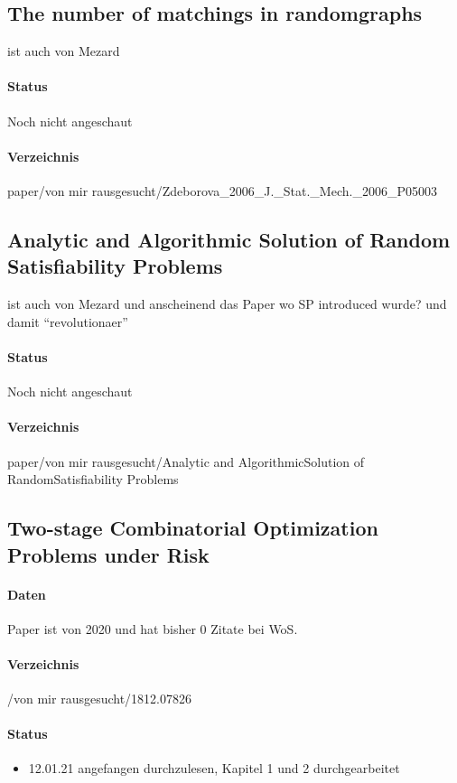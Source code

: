 \documentclass[paper=a4,10pt]{scrartcl}
\begin{document}
\subsection{The number of matchings in randomgraphs}

ist auch von Mezard

\paragraph{Status} Noch nicht angeschaut
\paragraph{Verzeichnis} paper/von mir rausgesucht/Zdeborova\_2006\_J.\_Stat.\_Mech.\_2006\_P05003

\subsection{Analytic and Algorithmic Solution of Random Satisfiability Problems}

ist auch von Mezard und anscheinend das Paper wo SP introduced wurde? und damit ``revolutionaer''

\paragraph{Status} Noch nicht angeschaut
\paragraph{Verzeichnis} paper/von mir rausgesucht/Analytic and AlgorithmicSolution of RandomSatisfiability Problems


\subsection{Two-stage Combinatorial Optimization Problems under Risk}
\label{sec:paper1}
\paragraph{Daten} Paper ist von 2020 und hat bisher 0 Zitate bei WoS.
\paragraph{Verzeichnis} /von mir rausgesucht/1812.07826
\paragraph{Status}
\begin{itemize}
\item 12.01.21 angefangen durchzulesen, Kapitel 1 und 2 durchgearbeitet
\end{itemize}
\end{document}
